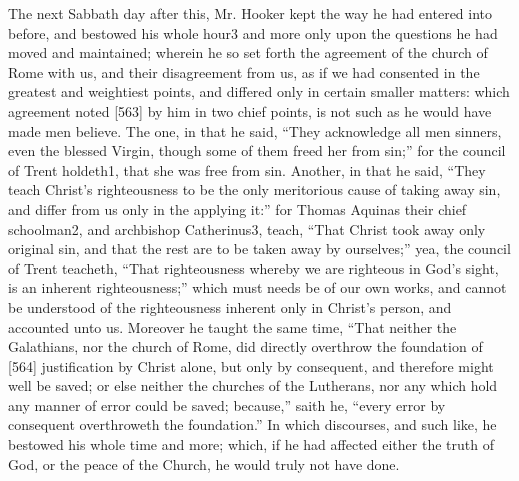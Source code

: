 The next Sabbath day after this, Mr. Hooker kept the way he had entered into before, and bestowed his whole hour3 and more only upon the questions he had moved and maintained; wherein he so set forth the agreement of the church of Rome with us, and their disagreement from us, as if we had consented in the greatest and weightiest points, and differed only in certain smaller matters: which agreement noted [563] by him in two chief points, is not such as he would have made men believe. The one, in that he said, “They acknowledge all men sinners, even the blessed Virgin, though some of them freed her from sin;” for the council of Trent holdeth1, that she was free from sin. Another, in that he said, “They teach Christ’s righteousness to be the only meritorious cause of taking away sin, and differ from us only in the applying it:” for Thomas Aquinas their chief schoolman2, and archbishop Catherinus3, teach, “That Christ took away only original sin, and that the rest are to be taken away by ourselves;” yea, the council of Trent teacheth, “That righteousness whereby we are righteous in God’s sight, is an inherent righteousness;” which must needs be of our own works, and cannot be understood of the righteousness inherent only in Christ’s person, and accounted unto us. Moreover he taught the same time, “That neither the Galathians, nor the church of Rome, did directly overthrow the foundation of [564] justification by Christ alone, but only by consequent, and therefore might well be saved; or else neither the churches of the Lutherans, nor any which hold any manner of error could be saved; because,” saith he, “every error by consequent overthroweth the foundation.” In which discourses, and such like, he bestowed his whole time and more; which, if he had affected either the truth of God, or the peace of the Church, he would truly not have done.

